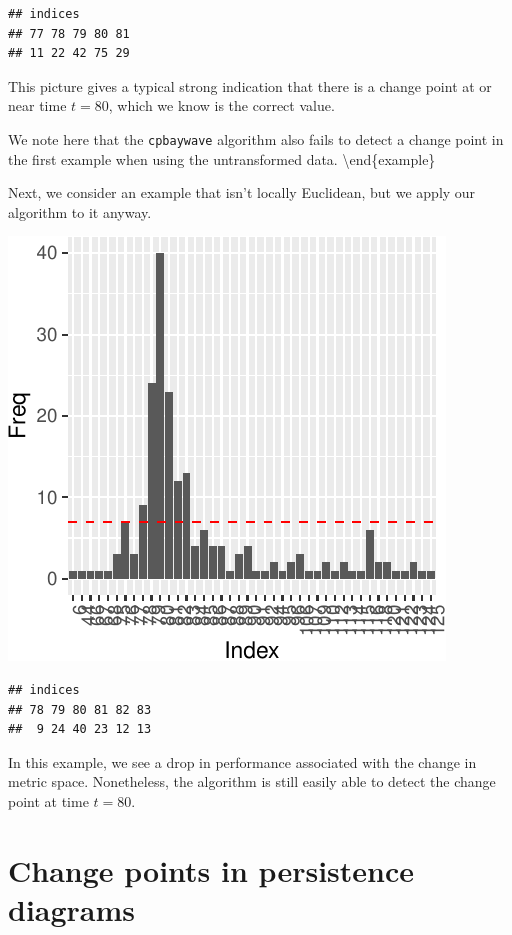 \documentclass[smallextended]{svjour3}       %
\begin{document}
\begin{verbatim}
## indices
## 77 78 79 80 81 
## 11 22 42 75 29
\end{verbatim}

This picture gives a typical strong indication that there is a change
point at or near time \(t = 80\), which we know is the correct value.

We note here that the \texttt{cpbaywave} algorithm also fails to detect
a change point in the first example when using the untransformed data.
\textbackslash{}end\{example\}

Next, we consider an example that isn't locally Euclidean, but we apply
our algorithm to it anyway.

\begin{center}\includegraphics{springer_template_files/figure-latex/unnamed-chunk-5-1} \end{center}

\begin{verbatim}
## indices
## 78 79 80 81 82 83 
##  9 24 40 23 12 13
\end{verbatim}

In this example, we see a drop in performance associated with the change
in metric space. Nonetheless, the algorithm is still easily able to
detect the change point at time \(t = 80\).

\section{Change points in persistence diagrams}\label{sec:2}
\end{document}

